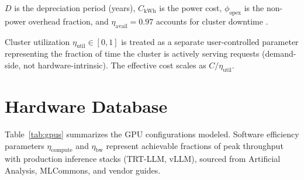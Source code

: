 \documentclass[11pt, letterpaper]{article}
\begin{document}
$D$ is the depreciation period (years), $C_\text{kWh}$ is the power cost,
$\phi_\text{opex}$ is the non-power overhead fraction, and $\eta_\text{avail}
= 0.97$ accounts for cluster downtime \cite{aws2023sla}.

Cluster utilization $\eta_\text{util} \in [0,1]$ is treated as a separate
user-controlled parameter representing the fraction of time the cluster is
actively serving requests (demand-side, not hardware-intrinsic). The effective
cost scales as $C / \eta_\text{util}$.

\section{Hardware Database}

Table~\ref{tab:gpus} summarizes the GPU configurations modeled.
Software efficiency parameters $\eta_\text{compute}$ and $\eta_\text{bw}$
represent achievable fractions of peak throughput with production inference
stacks (TRT-LLM, vLLM), sourced from Artificial Analysis,
MLCommons, and vendor guides.

\begin{table}[H]
\centering
\caption{GPU hardware parameters modeled in the oracle.}
\label{tab:gpus}
\end{table}
\end{document}
